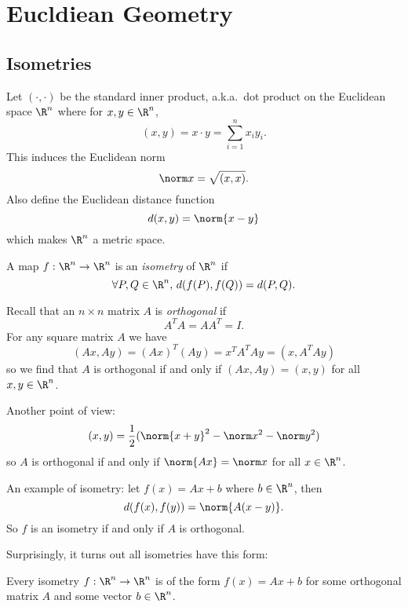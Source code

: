 \documentclass[a4paper]{article}
\theoremstyle{definition}
\begin{document}


\tableofcontents

\section{Eucldiean Geometry}

\subsection{Isometries}

Let \((\cdot, \cdot)\) be the standard inner product, a.k.a.\ dot product on the Euclidean space \(\R^n\) where for \(x, y \in \R^n\),
\[
  (x, y) = x \cdot y = \sum_{i = 1}^{n}x_iy_i.
\]
This induces the Euclidean norm
\[
  \norm x = \sqrt{(x, x)}.
\]
Also define the Euclidean distance function
\[
  d(x, y) = \norm{x - y}
\]
which makes \(\R^n\) a metric space.

\begin{definition}[Isometry]
  A map \(f: \R^n \to \R^n\) is an \emph{isometry} of \(\R^n\) if
  \[
    \forall P, Q \in \R^n,\, d(f(P), f(Q)) = d(P, Q).
  \]
\end{definition}

Recall that an \(n \times n\) matrix \(A\) is \emph{orthogonal} if
\[
  A^TA = AA^T = I.
\]
For any square matrix \(A\) we have
\[
  (Ax, Ay) = (Ax)^T(Ay) = x^TA^TAy = (x, A^TAy)
\]
so we find that \(A\) is orthogonal if and only if \((Ax, Ay) = (x, y)\) for all \(x, y \in \R^n\).

Another point of view:
\[
  (x, y) = \frac{1}{2}(\norm{x + y}^2 -  \norm x^2 - \norm y^2)
\]
so \(A\) is orthogonal if and only if \(\norm{Ax} = \norm x\) for all \(x \in \R^n\).

An example of isometry: let \(f(x) = Ax + b\) where \(b \in \R^n\), then
\[
  d(f(x), f(y)) = \norm{A(x - y)}.
\]
So \(f\) is an isometry if and only if \(A\) is orthogonal.

Surprisingly, it turns out all isometries have this form:

\begin{theorem}
  Every isometry \(f: \R^n \to \R^n\) is of the form \(f(x) = Ax + b\) for some orthogonal matrix \(A\) and some vector \(b \in \R^n\).
\end{theorem}
\end{document}
